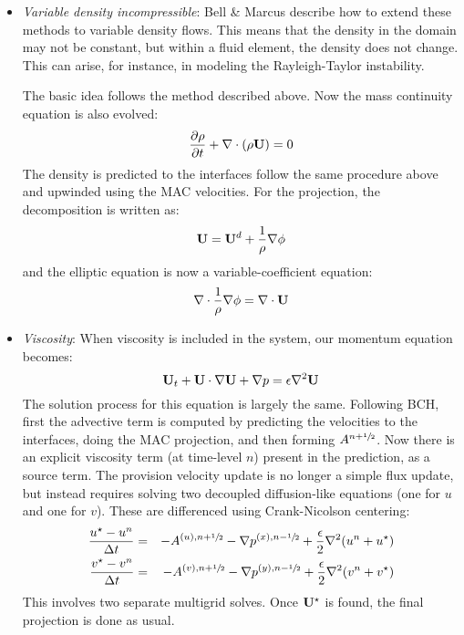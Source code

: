 \begin{itemize}

\item {\em Variable density incompressible}: Bell \& Marcus
  \cite{BellMarcus} describe how to extend these methods to variable
  density flows.  This means that the density in the domain may not be
  constant, but within a fluid element, the density does not change.
  This can arise, for instance, in modeling the Rayleigh-Taylor
  instability.

  The basic idea follows the method described above.  Now the 
  mass continuity equation is also evolved:
  \begin{equation}
  \frac{\partial \rho}{\partial t} + \nabla \cdot (\rho {\bf U}) = 0
  \end{equation}
  The density is predicted to the interfaces follow the same procedure
  above and upwinded using the MAC velocities.
  For the projection, the decomposition is written as:
  \begin{equation}
  {\bf U} = {\bf U}^d + \frac{1}{\rho}\nabla \phi
  \end{equation}
  and the elliptic equation is now a variable-coefficient equation:
  \begin{equation}
  \nabla \cdot \frac{1}{\rho} \nabla \phi = \nabla \cdot {\bf U}
  \end{equation}

\item {\em Viscosity}: When viscosity is included in the system, our
  momentum equation becomes:
  \begin{equation}
  {\bf U}_t + {\bf U}\cdot \nabla {\bf U} + \nabla p = \epsilon \nabla^2 {\bf U}
  \end{equation}
  The solution process for this equation is largely the same.
  Following BCH, first the advective term is computed by predicting
  the velocities to the interfaces, doing the MAC projection, and then
  forming $A^{n+{\sfrac{1}{2}}}$.  Now there is an explicit viscosity term (at
  time-level $n$) present in the prediction, as a source term.  The
  provision velocity update is no longer a simple flux update, but
  instead requires solving two decoupled diffusion-like equations (one
  for $u$ and one for $v$).  These are differenced using
  Crank-Nicolson centering:
  \begin{eqnarray}
  \frac{u^\star - u^n}{\Delta t} &=& - A^{(u),n+{\sfrac{1}{2}}} - \nabla p^{(x),n-{\sfrac{1}{2}}} 
       + \frac{\epsilon }{2} \nabla^2 (u^n + u^\star) \\
  \frac{v^\star - v^n}{\Delta t} &=& - A^{(v),n+{\sfrac{1}{2}}} - \nabla p^{(y),n-{\sfrac{1}{2}}} 
       + \frac{\epsilon }{2} \nabla^2 (v^n + v^\star) 
  \end{eqnarray}
  This involves two separate multigrid solves.  Once ${\bf U}^\star$ is found,
  the final projection is done as usual.


\end{itemize}
